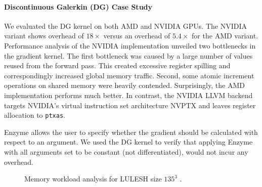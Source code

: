 \paragraph{\textbf{Discontinuous Galerkin (DG) Case Study}}
\label{par:dg}
We evaluated the DG kernel on both AMD and NVIDIA GPUs. The NVIDIA variant shows  overhead of $18\times$ versus an overhead of $5.4\times$ for the AMD variant. Performance analysis of the NVIDIA implementation unveiled two bottlenecks in the gradient kernel. The first bottleneck was caused by a large number of values reused from the forward pass. This created excessive register spilling and correspondingly increased global memory traffic. Second, some atomic increment operations on shared memory were heavily contended. Surprisingly, the AMD implementation performs much better.  In contrast, the NVIDIA LLVM backend targets NVIDIA's virtual instruction set architecture NVPTX and leaves register allocation to \texttt{ptxas}.


Enzyme allows  the user to specify whether the gradient should be calculated with respect to an argument. We used the DG kernel to verify that applying Enzyme with all arguments set to be constant (not differentiated), would not incur any overhead.


\begin{figure}
    \centering
    \caption{Memory workload analysis for LULESH  size $135^{3}$ . %
    }
    \label{fig:memory_hierarchy}
\end{figure}

